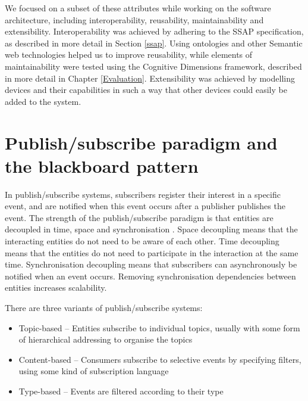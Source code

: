 We focused on a subset of these attributes while working on the software architecture, including interoperability, reusability, maintainability and extensibility. Interoperability was achieved by adhering to the \ac{SSAP} specification, as described in more detail in Section \ref{ssap}. Using ontologies and other Semantic web technologies helped us to improve reusability, while elements of maintainability were tested using the Cognitive Dimensions framework, described in more detail in Chapter \ref{Evaluation}. Extensibility was achieved by modelling devices and their capabilities in such a way that other devices could easily be added to the system.
% 


\section{Publish/subscribe paradigm and the blackboard pattern}
\label{pubsubblackboard}
In publish/subscribe systems, subscribers register their interest in a specific event, and are notified when this event occurs after a publisher publishes the event. The strength of the publish/subscribe par\-a\-digm is that entities are decoupled in time, space and synchronisation \cite{Eugster2003}. Space decoupling means that the interacting entities do not need to be aware of each other. Time decoupling means that the entities do not need to participate in the interaction at the same time. Synchronisation decoupling means that subscribers can asynchronously be notified when an event occurs. Removing synchronisation dependencies between entities increases scalability.

There are three variants of publish/subscribe systems:

\begin{itemize}
	\item Topic-based -- Entities subscribe to individual topics, usually with some form of hierarchical addressing to organise the topics
	\item Content-based -- Consumers subscribe to selective events by specifying filters, using some kind of subscription language
	\item Type-based -- Events are filtered according to their type
\end{itemize}

